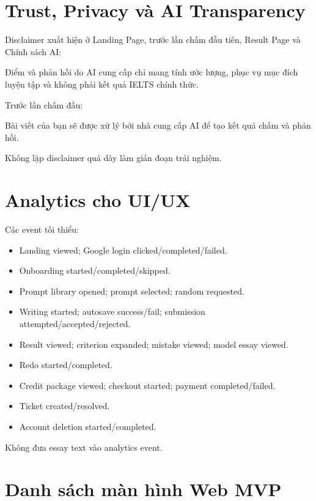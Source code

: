 \documentclass[11pt,a4paper]{article}
\begin{document}
\section{Trust, Privacy và AI Transparency}
Disclaimer xuất hiện ở Landing Page, trước lần chấm đầu tiên, Result Page và Chính sách AI:
\begin{copybox}
Điểm và phản hồi do AI cung cấp chỉ mang tính ước lượng, phục vụ mục đích luyện tập và không phải kết quả IELTS chính thức.
\end{copybox}

Trước lần chấm đầu:
\begin{copybox}
Bài viết của bạn sẽ được xử lý bởi nhà cung cấp AI để tạo kết quả chấm và phản hồi.
\end{copybox}

Không lặp disclaimer quá dày làm gián đoạn trải nghiệm.

\section{Analytics cho UI/UX}
Các event tối thiểu:
\begin{itemize}
  \item Landing viewed; Google login clicked/completed/failed.
  \item Onboarding started/completed/skipped.
  \item Prompt library opened; prompt selected; random requested.
  \item Writing started; autosave success/fail; submission attempted/accepted/rejected.
  \item Result viewed; criterion expanded; mistake viewed; model essay viewed.
  \item Redo started/completed.
  \item Credit package viewed; checkout started; payment completed/failed.
  \item Ticket created/resolved.
  \item Account deletion started/completed.
\end{itemize}
Không đưa essay text vào analytics event.

\section{Danh sách màn hình Web MVP}
\end{document}
